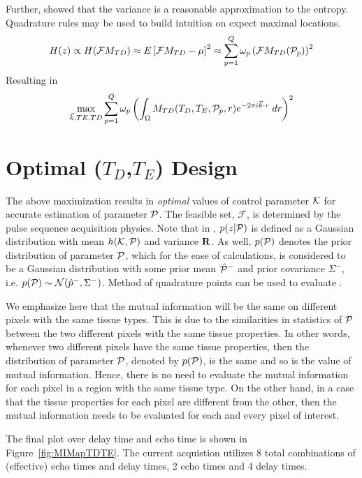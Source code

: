 \documentclass{article}         %
\theoremstyle{definition}
\theoremstyle{remark}
\begin{document}
Further, \cite{madankan2015accelerated} showed that the variance is a reasonable
approximation to the entropy. Quadrature rules may be used to build
intuition on expect maximal locations.
\[
 H(z)   \propto H(\mathcal{F}M_{TD} )
   \approx E\left[\mathcal{F}M_{TD} - \mu\right]^2
   \approx \sum_{p=1}^Q \omega_p \left( \mathcal{F}M_{TD}(\mathcal{P}_p) \right)^2
\]
Resulting in 
\[
   \max_{\vec{k},TE,TD} \sum_{p=1}^Q \omega_p \left(
     \int_\Omega M_{TD}(T_D,T_E,\mathcal{P}_p,r)
          e^{-2  \pi i \vec{k}  \cdot r } \; dr
     \right)^2
\]


\section{Optimal ($T_D$,$T_E$) Design}\label{oed}

The above maximization results in \textit{optimal} values of control parameter
$\mathcal{K}$ for accurate estimation of parameter $\mathcal{P}$. 
The feasible set, $\mathcal{F}$, is determined by the pulse sequence acquisition physics.
Note that in ,
$p(z|\mathcal{P})$ is defined as a Gaussian distribution with mean $h(\mathcal{K},\mathcal{P})$ and
variance $\mathbf{R}$. As well, $p(\mathcal{P})$ denotes the prior distribution of parameter
$\mathcal{P}$, which for the ease of calculations, is considered to be a Gaussian
distribution with some prior mean $\hat{\mathcal{P}}^-$ and prior covariance $\Sigma^-$,
i.e. $p(\mathcal{P})\sim \mathcal{N}(\hat{p}^-,\Sigma^-)$. Method of quadrature points
can be used to evaluate . 

We emphasize here that the mutual information will be the same on different pixels with the same tissue types. This is due to the similarities in statistics of $\mathcal{P}$ between the two different pixels with the same tissue properties. In other words, whenever two different pixels have the same tissue properties, then the distribution of parameter $\mathcal{P}$, denoted by $p(\mathcal{P})$, is the same and so is the value of mutual information. Hence, there is no need to evaluate the mutual information for each pixel in a region with the same tissue type. 
On the other hand, in a case that the tissue properties for each pixel are different from the other, then the mutual information needs to be evaluated for each and every pixel of interest.

The final plot over delay time and echo time is shown in Figure~\ref{fig:MIMapTDTE}.
The current acquistion utilizes 8 total combinations of (effective) echo times 
and delay times, 2 echo times and 4 delay times.
\end{document}
